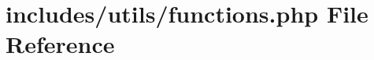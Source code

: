 \hypertarget{functions_8php}{}\section{includes/utils/functions.php File Reference}
\label{functions_8php}
